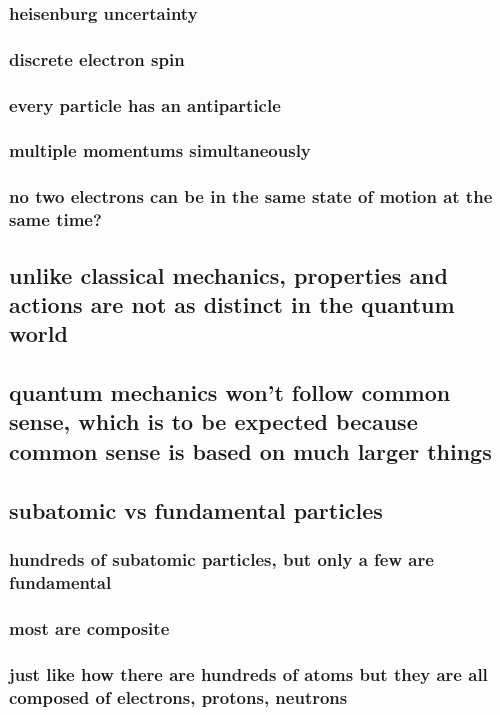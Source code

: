 \documentclass[letterpaper]{article}
\begin{document}
\subsubsection{heisenburg uncertainty}
\label{sec:org60eb676}
\subsubsection{discrete electron spin}
\label{sec:org091ba47}
\subsubsection{every particle has an antiparticle}
\label{sec:org61e034a}
\subsubsection{multiple momentums simultaneously}
\label{sec:org73432fb}
\subsubsection{no two electrons can be in the same state of motion at the same time?}
\label{sec:org8cb4e1f}
\subsection{unlike classical mechanics, properties and actions are not as distinct in the quantum world}
\label{sec:org4211e2b}
\subsection{quantum mechanics won't follow common sense, which is to be expected because common sense is based on much larger things}
\label{sec:orgfede620}
\subsection{subatomic vs fundamental particles}
\label{sec:org1a81fed}
\subsubsection{hundreds of subatomic particles, but only a few are fundamental}
\label{sec:orgc85f5f3}
\subsubsection{most are composite}
\label{sec:org84bc737}
\subsubsection{just like how there are hundreds of atoms but they are all composed of electrons, protons, neutrons}
\label{sec:org6be63a3}
\end{document}
